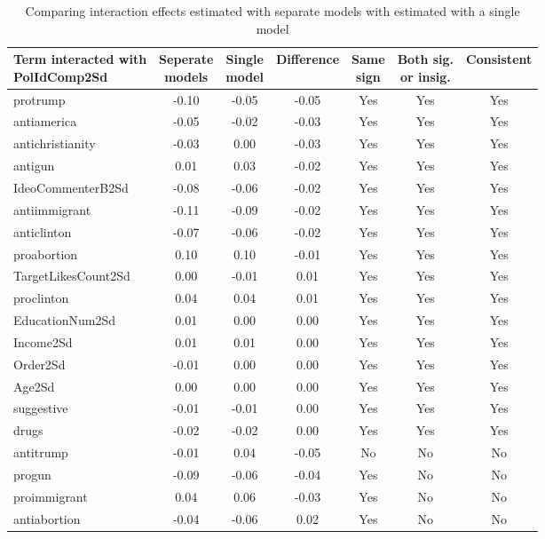 \begin{table}[!h]
\centering
\caption{\label{tab:interaction-effects-comparison}Comparing interaction effects estimated with separate models with estimated with a single model}
\centering
\begin{tabular}[t]{lcccccc}
\toprule
\makecell[l]{Term interacted with\\PolIdComp2Sd} & \makecell[l]{Seperate\\models} & \makecell[l]{Single\\model} & Difference & \makecell[l]{Same\\sign} & \makecell[l]{Both sig.\\or insig.} & Consistent\\
\midrule
protrump & -0.10 & -0.05 & -0.05 & Yes & Yes & Yes\\
\cmidrule{1-7}
antiamerica & -0.05 & -0.02 & -0.03 & Yes & Yes & Yes\\
\cmidrule{1-7}
antichristianity & -0.03 & 0.00 & -0.03 & Yes & Yes & Yes\\
\cmidrule{1-7}
antigun & 0.01 & 0.03 & -0.02 & Yes & Yes & Yes\\
\cmidrule{1-7}
IdeoCommenterB2Sd & -0.08 & -0.06 & -0.02 & Yes & Yes & Yes\\
\cmidrule{1-7}
antiimmigrant & -0.11 & -0.09 & -0.02 & Yes & Yes & Yes\\
\cmidrule{1-7}
anticlinton & -0.07 & -0.06 & -0.02 & Yes & Yes & Yes\\
\cmidrule{1-7}
proabortion & 0.10 & 0.10 & -0.01 & Yes & Yes & Yes\\
\cmidrule{1-7}
TargetLikesCount2Sd & 0.00 & -0.01 & 0.01 & Yes & Yes & Yes\\
\cmidrule{1-7}
proclinton & 0.04 & 0.04 & 0.01 & Yes & Yes & Yes\\
\cmidrule{1-7}
EducationNum2Sd & 0.01 & 0.00 & 0.00 & Yes & Yes & Yes\\
\cmidrule{1-7}
Income2Sd & 0.01 & 0.01 & 0.00 & Yes & Yes & Yes\\
\cmidrule{1-7}
Order2Sd & -0.01 & 0.00 & 0.00 & Yes & Yes & Yes\\
\cmidrule{1-7}
Age2Sd & 0.00 & 0.00 & 0.00 & Yes & Yes & Yes\\
\cmidrule{1-7}
suggestive & -0.01 & -0.01 & 0.00 & Yes & Yes & Yes\\
\cmidrule{1-7}
drugs & -0.02 & -0.02 & 0.00 & Yes & Yes & Yes\\
\cmidrule{1-7}
antitrump & -0.01 & 0.04 & -0.05 & No & No & No\\
\cmidrule{1-7}
progun & -0.09 & -0.06 & -0.04 & Yes & No & No\\
\cmidrule{1-7}
proimmigrant & 0.04 & 0.06 & -0.03 & Yes & No & No\\
\cmidrule{1-7}
antiabortion & -0.04 & -0.06 & 0.02 & Yes & No & No\\
\bottomrule
\end{tabular}
\end{table}
